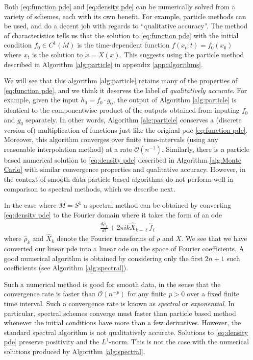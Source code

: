 \documentclass[12pt]{amsart}
\begin{document}
Both \eqref{eq:function pde} and \eqref{eq:density pde} can be numerically solved from a variety of schemes, each with its own benefit.
For example, particle methods can be used, and do a decent job with regards to ``qualitative accuracy''.
The method of characteristics tells us that
the solution to \eqref{eq:function pde} with the initial condition $f_{0} \in C^{1}(M)$ is the time-dependent function $f( x_{t} ;t) = f_{0}( x_{0} )$ where $x_{t}$ is the solution to $\dot{x} = X(x)$.
This suggests using the particle method described in Algorithm \ref{alg:particle} in appendix \ref{app:algorithms}.
 
We will see that this algorithm \eqref{alg:particle} retains many of the properties of \eqref{eq:function pde},
and we think it deserves the label of \emph{qualitatively accurate}.
For example, given the input $h_{0} = f_{0} \cdot g_{0}$, the output of Algorithm \ref{alg:particle} is identical to the componentwise product of the outputs obtained from inputing $f_{0}$ and $g_{0}$ separately.
In other words, Algorithm \ref{alg:particle} conserves a (discrete version of) multiplication of functions just like the original pde \eqref{eq:function pde}.
Moreover, this algorithm converges over finite time-intervals (using any reasonable interpolation method) at a rate $\mathcal{O}(n^{-1})$.
Similarly, there is a particle based numerical solution to \eqref{eq:density pde} described in Algorithm \ref{alg:Monte Carlo} with similar convergence properties and qualitative accuracy.
However, in the context of smooth data particle based algorithms do not perform well in comparison to spectral methods, which we describe next.

In the case where $M=S^{1}$ a spectral method can be obtained by converting \eqref{eq:density pde} to the Fourier domain where it takes the form
of an ode
\begin{align}
	\frac{d \hat{\rho}_{k}}{dt} + 2\pi i k  \widehat{X}_{k-\ell} \hat{f}_{\ell} \label{eq:standard spectral}
\end{align}
where $\hat{\rho}_{k}$ and $\widehat{X}_{k}$ denote the Fourier transforms of $\rho$ and $X$.
We see that we have converted our linear pde into a linear ode on the space of Fourier coefficients.
A good numerical algorithm is obtained by considering only the first $2n+1$ such coefficients (see Algorithm \ref{alg:spectral}).



Such a numerical method is good for smooth data, in the sense that the convergence rate is faster than $\mathcal{O}(n^{-p})$ for any finite $p > 0$ over a fixed finite time interval.
Such a convergence rate is known as \emph{spectral} or \emph{exponential}.
In particular, spectral schemes converge must faster than particle based method whenever the initial conditions have more than a few derivatives.
However, the standard spectral algorithm is not qualitatively accurate.
Solutions to \eqref{eq:density pde} preserve positivity and the $L^{1}$-norm.  This is not the case with the numerical solutions produced by Algorithm \ref{alg:spectral}.
\end{document}
